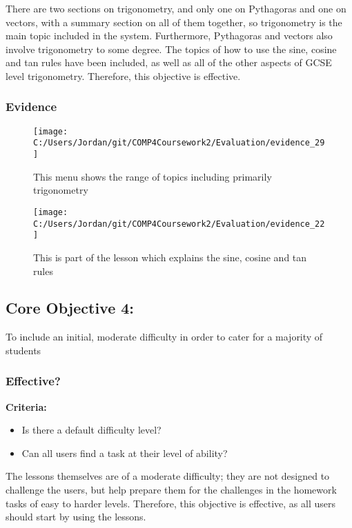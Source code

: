 There are two sections on trigonometry, and only one on Pythagoras and one on vectors, with a summary section on all of them together, so trigonometry is the main topic included in the system. Furthermore, Pythagoras and vectors also involve trigonometry to some degree. The topics of how to use the sine, cosine and tan rules have been included, as well as all of the other aspects of GCSE level trigonometry. Therefore, this objective is effective.

\subsubsection{Evidence}

\begin{figure}[H]
	\texttt{[image: C:/Users/Jordan/git/COMP4Coursework2/Evaluation/evidence\_29]}
	\caption{This menu shows the range of topics including primarily trigonometry}
\end{figure}

\begin{figure}[H]
	\texttt{[image: C:/Users/Jordan/git/COMP4Coursework2/Evaluation/evidence\_22]}
	\caption{This is part of the lesson which explains the sine, cosine and tan rules}
\end{figure}

\subsection{Core Objective 4: }

To include an initial, moderate difficulty in order to cater for a majority of students

\subsubsection{Effective?}

\textbf{Criteria: }

\begin{itemize}
	\item Is there a default difficulty level?
	\item Can all users find a task at their level of ability?
\end{itemize}

The lessons themselves are of a moderate difficulty; they are not designed to challenge the users, but help prepare them for the challenges in the homework tasks of easy to harder levels. Therefore, this objective is effective, as all users should start by using the lessons.

